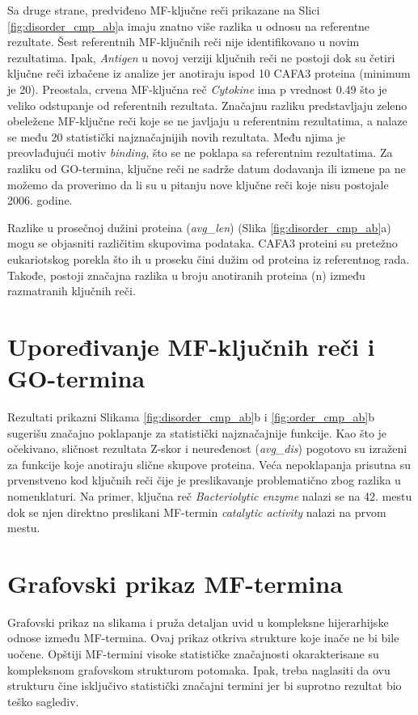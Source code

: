 Sa druge strane, predviđeno  MF-ključne reči prikazane na
Slici \ref{fig:disorder_cmp_ab}a imaju znatno više razlika u odnosu na
referentne rezultate.  Šest referentnih MF-ključnih reči nije identifikovano u
novim rezultatima. Ipak, \textit{Antigen} u novoj verziji ključnih reči ne
postoji dok su četiri ključne reči izbačene iz analize jer anotiraju ispod 10
CAFA3 proteina (minimum je 20).  Preostala, crvena MF-ključna reč
\textit{Cytokine} ima p vrednost 0.49 što je veliko odstupanje od referentnih
rezultata. Značajnu razliku predstavljaju zeleno obeležene MF-ključne reči koje
se ne javljaju u referentnim rezultatima, a nalaze se među 20 statistički
najznačajnijih novih rezultata. Među njima je preovlađujući motiv \textit{binding}, 
što se ne poklapa sa referentnim rezultatima. Za razliku od GO-termina,
ključne reči ne sadrže datum dodavanja ili izmene pa ne možemo da proverimo da
li su u pitanju nove ključne reči koje nisu postojale 2006. godine.

Razlike u prosečnoj dužini proteina (\textit{avg\_len}) (Slika
\ref{fig:disorder_cmp_ab}a) mogu se objasniti različitim skupovima podataka.
CAFA3 proteini su pretežno eukariotskog porekla što ih u proseku čini dužim od
proteina iz referentnog rada. Takođe, postoji značajna razlika u broju
anotiranih proteina (n) između razmatranih ključnih reči.


\section{Upoređivanje MF-ključnih reči i GO-termina}

Rezultati prikazni Slikama \ref{fig:disorder_cmp_ab}b i
\ref{fig:order_cmp_ab}b sugerišu značajno poklapanje za statistički
najznačajnije funkcije. Kao što je očekivano, sličnost rezultata Z-skor i
neuređenost (\textit{avg\_dis}) pogotovo su izraženi za funkcije koje anotiraju
slične skupove proteina. Veća nepoklapanja prisutna su prvenstveno kod ključnih
reči čije je preslikavanje problematično zbog razlika u nomenklaturi. Na primer,
ključna reč \textit{Bacteriolytic enzyme} nalazi se na 42. mestu dok se njen
direktno preslikani MF-termin \textit{catalytic activity} nalazi na prvom mestu.

\section{Grafovski prikaz MF-termina}

Grafovski prikaz na slikama  i  pruža
detaljan uvid u kompleksne hijerarhijske odnose između MF-termina. Ovaj prikaz otkriva
strukture koje inače ne bi bile uočene.  Opštiji MF-termini visoke statističke
značajnosti okarakterisane su kompleksnom grafovskom strukturom potomaka. Ipak,
treba naglasiti da ovu strukturu čine isključivo statistički značajni termini
jer bi suprotno rezultat bio  teško saglediv.

